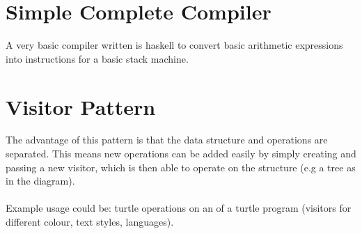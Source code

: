 \documentclass{report}
\begin{document}
    \section*{Simple Complete Compiler}
        A very basic compiler written is haskell to convert basic arithmetic expressions into instructions for a basic stack machine.

    \section*{Visitor Pattern}
        The advantage of this pattern is that the data structure and operations are separated. This means new operations can be added easily by simply creating and passing a new visitor, which is then able to operate on the structure (e.g a tree as in the diagram).
        \\
        \\ Example usage could be: turtle operations on an  of a turtle program (visitors for different colour, text styles, languages).
\end{document}

